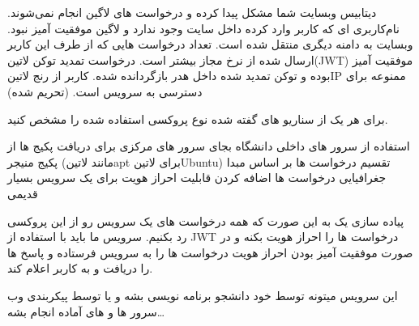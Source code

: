 \documentclass{../assignment}
\begin{document}
 دیتابیس وبسایت شما مشکل پیدا کرده و درخواست های لاگین انجام نمی‌شوند.
 نام‌کاربری ای که کاربر وارد کرده داخل سایت وجود ندارد و لاگین موفقیت آمیز نبود.
 وبسایت به دامنه دیگری منتقل شده است.
 تعداد درخواست هایی که از طرف این کاربر ارسال شده از نرخ مجاز بیشتر است.
 درخواست تمدید توکن ‌لاتین{(JWT)} موفقیت آمیز بوده و توکن تمدید شده داخل هدر بازگردانده شده.
 کاربر از رنج ‌لاتین{IP} ممنوعه برای دسترسی به سرویس است. (تحریم شده)


برای هر یک از سناریو های گفته شده نوع پروکسی استفاده شده را مشخص کنید.

 استفاده از سرور های داخلی دانشگاه بجای سرور های مرکزی برای دریافت پکیج ها از پکیج منیجر (مانند ‌لاتین{apt} برای ‌لاتین{Ubuntu})
 تقسیم درخواست ها بر اساس مبدا جغرافیایی درخواست ها
 اضافه کردن قابلیت احراز هویت برای یک سرویس بسیار قدیمی


پیاده سازی یک  به این صورت که همه درخواست های یک سرویس رو از این پروکسی رد بکنیم. سرویس ما باید با استفاده از JWT درخواست ها را احراز هویت بکنه و در صورت موفقیت آمیز بودن احراز هویت درخواست ها را به سرویس فرستاده و پاسخ ها را دریافت و به کاربر اعلام کند.

این سرویس میتونه توسط خود دانشجو برنامه نویسی بشه و یا توسط پیکربندی وب سرور ها و  های آماده انجام بشه…

\makefooter
\end{document}
